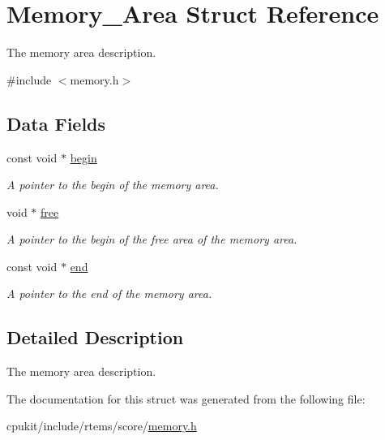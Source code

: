 \hypertarget{structMemory__Area}{}\section{Memory\+\_\+\+Area Struct Reference}
\label{structMemory__Area}


The memory area description.  




{\ttfamily \#include $<$memory.\+h$>$}

\subsection*{Data Fields}
\begin{DoxyCompactItemize}
\item 
\mbox{\label{structMemory__Area_ad1159e0eb014eb9202cad9dfaf9c9326}} 
const void $\ast$ \mbox{\hyperlink{structMemory__Area_ad1159e0eb014eb9202cad9dfaf9c9326}{begin}}
\begin{DoxyCompactList}\small\item\em A pointer to the begin of the memory area. \end{DoxyCompactList}\item 
\mbox{\label{structMemory__Area_ae2b8b53804aefb2ece8deff7380d17d3}} 
void $\ast$ \mbox{\hyperlink{structMemory__Area_ae2b8b53804aefb2ece8deff7380d17d3}{free}}
\begin{DoxyCompactList}\small\item\em A pointer to the begin of the free area of the memory area. \end{DoxyCompactList}\item 
\mbox{\label{structMemory__Area_ac1eb101465e7bd242945028252a8c348}} 
const void $\ast$ \mbox{\hyperlink{structMemory__Area_ac1eb101465e7bd242945028252a8c348}{end}}
\begin{DoxyCompactList}\small\item\em A pointer to the end of the memory area. \end{DoxyCompactList}\end{DoxyCompactItemize}


\subsection{Detailed Description}
The memory area description. 

The documentation for this struct was generated from the following file\+:\begin{DoxyCompactItemize}
\item 
cpukit/include/rtems/score/\mbox{\hyperlink{rtems_2score_2memory_8h}{memory.\+h}}\end{DoxyCompactItemize}
